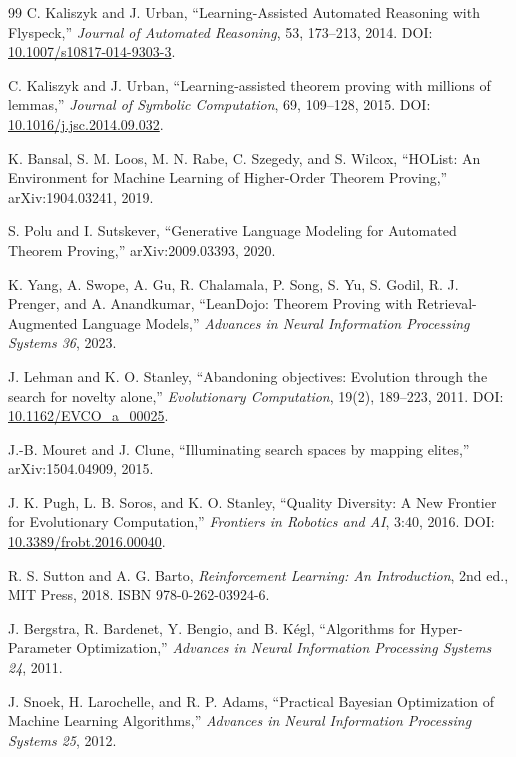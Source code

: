 \documentclass[11pt]{article}
\theoremstyle{datatheorem}
\theoremstyle{definition}
\begin{document}
\begin{thebibliography}{99}
C. Kaliszyk and J. Urban, ``Learning-Assisted Automated Reasoning with Flyspeck,'' \emph{Journal of Automated Reasoning}, 53, 173--213, 2014. DOI: \href{https://doi.org/10.1007/s10817-014-9303-3}{10.1007/s10817-014-9303-3}.

C. Kaliszyk and J. Urban, ``Learning-assisted theorem proving with millions of lemmas,'' \emph{Journal of Symbolic Computation}, 69, 109--128, 2015. DOI: \href{https://doi.org/10.1016/j.jsc.2014.09.032}{10.1016/j.jsc.2014.09.032}.

K. Bansal, S. M. Loos, M. N. Rabe, C. Szegedy, and S. Wilcox, ``HOList: An Environment for Machine Learning of Higher-Order Theorem Proving,'' arXiv:1904.03241, 2019.

S. Polu and I. Sutskever, ``Generative Language Modeling for Automated Theorem Proving,'' arXiv:2009.03393, 2020.

K. Yang, A. Swope, A. Gu, R. Chalamala, P. Song, S. Yu, S. Godil, R. J. Prenger, and A. Anandkumar, ``LeanDojo: Theorem Proving with Retrieval-Augmented Language Models,'' \emph{Advances in Neural Information Processing Systems 36}, 2023.

J. Lehman and K. O. Stanley, ``Abandoning objectives: Evolution through the search for novelty alone,'' \emph{Evolutionary Computation}, 19(2), 189--223, 2011. DOI: \href{https://doi.org/10.1162/EVCO_a_00025}{10.1162/EVCO\_a\_00025}.

J.-B. Mouret and J. Clune, ``Illuminating search spaces by mapping elites,'' arXiv:1504.04909, 2015.

J. K. Pugh, L. B. Soros, and K. O. Stanley, ``Quality Diversity: A New Frontier for Evolutionary Computation,'' \emph{Frontiers in Robotics and AI}, 3:40, 2016. DOI: \href{https://doi.org/10.3389/frobt.2016.00040}{10.3389/frobt.2016.00040}.

R. S. Sutton and A. G. Barto, \emph{Reinforcement Learning: An Introduction}, 2nd ed., MIT Press, 2018. ISBN 978-0-262-03924-6.

J. Bergstra, R. Bardenet, Y. Bengio, and B. K\'egl, ``Algorithms for Hyper-Parameter Optimization,'' \emph{Advances in Neural Information Processing Systems 24}, 2011.

J. Snoek, H. Larochelle, and R. P. Adams, ``Practical Bayesian Optimization of Machine Learning Algorithms,'' \emph{Advances in Neural Information Processing Systems 25}, 2012.

\end{thebibliography}
\end{document}
